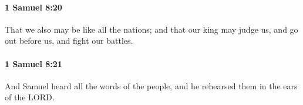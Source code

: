 		\paragraph{1 Samuel 8:20} %
			\label{1SAMUEL-8-20}

			That we also may be like all the nations; and that our king may judge us, and go out before us, and fight our battles.


		\paragraph{1 Samuel 8:21} %
			\label{1SAMUEL-8-21}

			And Samuel heard all the words of the people, and he rehearsed them in the ears of the LORD.


